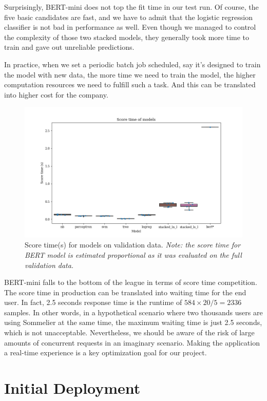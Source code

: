 \documentclass[
	a4paper,
	fontsize=10pt, %
	twoside=false, %
	secnumdepth=2, %
]{kaohandt}
\begin{document}
Surprisingly, BERT-mini does not top the fit time in our test run. Of course, the five basic candidates are fast, and we have to admit that the logistic regression classifier is not bad in performance as well. Even though we managed to control the complexity of those two stacked models, they generally took more time to train and gave out unreliable predictions.

In practice, when we set a periodic batch job scheduled, say it’s designed to train the model with new data, the more time we need to train the model, the higher computation resources we need to fulfill such a task. And this can be translated into higher cost for the company.

\begin{figure}[h]
	\includegraphics[]{metric_score_time.png}
	\caption{Score time(s) for models on validation data. \emph{Note: the score time for BERT model is estimated proportional as it was evaluated on the full validation data.}}
	\label{fig:score_time}
\end{figure}


BERT-mini falls to the bottom of the league in terms of score time competition. The score time in production can be translated into waiting time for the end user. In fact, 2.5 seconds response time is the runtime of $584\times 20 /5=2336$ samples. In other words, in a hypothetical scenario where two thousands users are using Sommelier at the same time, the maximum waiting time is just 2.5 seconds, which is not unacceptable. Nevertheless, we should be aware of the risk of large amounts of concurrent requests in an imaginary scenario. Making the application a real-time experience is a key optimization goal for our project.

\newpage

\section{Initial Deployment}
\end{document}
